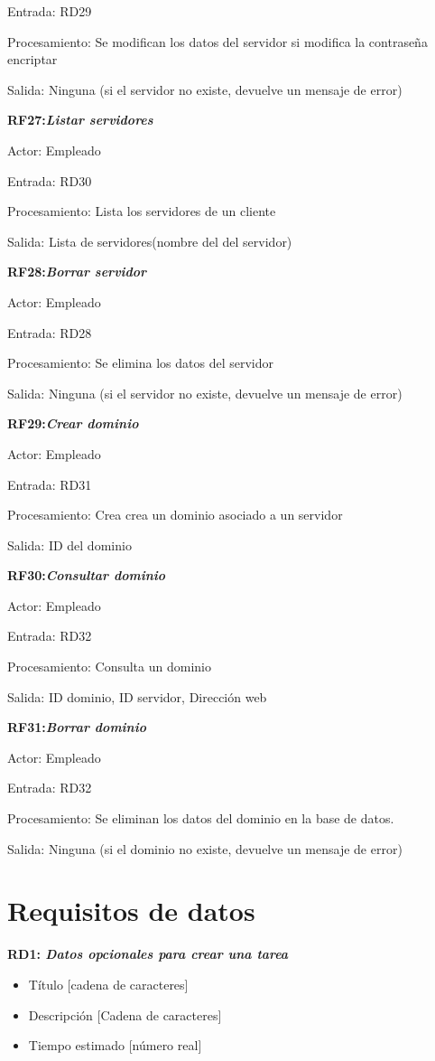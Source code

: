 \documentclass[paper=a4, fontsize=11pt, spanish]{scrartcl}
\begin{document}
Entrada: RD29

Procesamiento: Se modifican los datos del servidor si modifica la contraseña encriptar

Salida: Ninguna (si el servidor no existe, devuelve un mensaje de error)

\setlength{\parindent}{0em}
\textbf{RF27:\textit{Listar servidores}}
\setlength{\parindent}{3em}

Actor: Empleado

Entrada: RD30

Procesamiento: Lista los servidores de un cliente

Salida: Lista de servidores(nombre del del servidor)

\setlength{\parindent}{0em}
\textbf{RF28:\textit{Borrar servidor}}
\setlength{\parindent}{3em}

Actor: Empleado

Entrada: RD28

Procesamiento: Se elimina los datos del servidor

Salida: Ninguna  (si el servidor no existe, devuelve un mensaje de error)

\setlength{\parindent}{0em}
\textbf{RF29:\textit{Crear dominio}}
\setlength{\parindent}{3em}

Actor: Empleado

Entrada: RD31

Procesamiento: Crea crea un dominio asociado a un servidor

Salida: ID del dominio

\setlength{\parindent}{0em}
\textbf{RF30:\textit{Consultar dominio}}
\setlength{\parindent}{3em}

Actor: Empleado

Entrada: RD32

Procesamiento: Consulta un dominio

Salida: ID dominio, ID servidor, Dirección web

\setlength{\parindent}{0em}
\textbf{RF31:\textit{Borrar dominio}}
\setlength{\parindent}{3em}

Actor: Empleado

Entrada: RD32

Procesamiento: Se eliminan los datos del dominio en la base de datos.

Salida: Ninguna  (si el dominio no existe, devuelve un mensaje de error)

\section{Requisitos de datos}
\setlength{\parindent}{0em}
\textbf{RD1: \textit{Datos opcionales para crear una tarea}}
\setlength{\parindent}{2em}
\begin{itemize}
\item Título [cadena de caracteres]
\item Descripción [Cadena de caracteres]
\item Tiempo estimado [número real]
\end{itemize}
\end{document}
